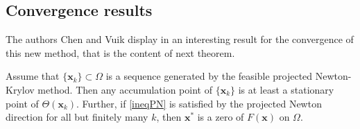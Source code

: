 \subsection{Convergence results}
The authors Chen and Vuik display in \cite{MAIN} an interesting result for the convergence of this new method, that is the content of next theorem. 
\begin{theorem}
	\label{sppaper}
	Assume that $\{\textbf{x}_k\} \subset \Omega$ is a sequence generated by the feasible projected Newton-Krylov method. Then any accumulation point of $ \{\textbf{x}_k\} $ is at least a stationary point of $ \Theta(\textbf{x}_k) $. Further, if \eqref{ineqPN} is satisfied by the projected Newton direction for all but finitely many $ k $, then $\textbf{x}^*  $ is a zero of $ F(\textbf{x}) $ on $ \Omega $.
\end{theorem}
